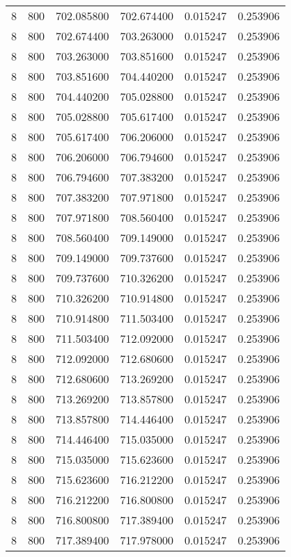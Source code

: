 \begin{longtable}{rrrrrr}
8 & 800 & 702.085800 & 702.674400 & 0.015247 & 0.253906 \\
8 & 800 & 702.674400 & 703.263000 & 0.015247 & 0.253906 \\
8 & 800 & 703.263000 & 703.851600 & 0.015247 & 0.253906 \\
8 & 800 & 703.851600 & 704.440200 & 0.015247 & 0.253906 \\
8 & 800 & 704.440200 & 705.028800 & 0.015247 & 0.253906 \\
8 & 800 & 705.028800 & 705.617400 & 0.015247 & 0.253906 \\
8 & 800 & 705.617400 & 706.206000 & 0.015247 & 0.253906 \\
8 & 800 & 706.206000 & 706.794600 & 0.015247 & 0.253906 \\
8 & 800 & 706.794600 & 707.383200 & 0.015247 & 0.253906 \\
8 & 800 & 707.383200 & 707.971800 & 0.015247 & 0.253906 \\
8 & 800 & 707.971800 & 708.560400 & 0.015247 & 0.253906 \\
8 & 800 & 708.560400 & 709.149000 & 0.015247 & 0.253906 \\
8 & 800 & 709.149000 & 709.737600 & 0.015247 & 0.253906 \\
8 & 800 & 709.737600 & 710.326200 & 0.015247 & 0.253906 \\
8 & 800 & 710.326200 & 710.914800 & 0.015247 & 0.253906 \\
8 & 800 & 710.914800 & 711.503400 & 0.015247 & 0.253906 \\
8 & 800 & 711.503400 & 712.092000 & 0.015247 & 0.253906 \\
8 & 800 & 712.092000 & 712.680600 & 0.015247 & 0.253906 \\
8 & 800 & 712.680600 & 713.269200 & 0.015247 & 0.253906 \\
8 & 800 & 713.269200 & 713.857800 & 0.015247 & 0.253906 \\
8 & 800 & 713.857800 & 714.446400 & 0.015247 & 0.253906 \\
8 & 800 & 714.446400 & 715.035000 & 0.015247 & 0.253906 \\
8 & 800 & 715.035000 & 715.623600 & 0.015247 & 0.253906 \\
8 & 800 & 715.623600 & 716.212200 & 0.015247 & 0.253906 \\
8 & 800 & 716.212200 & 716.800800 & 0.015247 & 0.253906 \\
8 & 800 & 716.800800 & 717.389400 & 0.015247 & 0.253906 \\
8 & 800 & 717.389400 & 717.978000 & 0.015247 & 0.253906 \\

\end{longtable}
